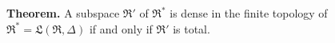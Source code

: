 \textbf{Theorem.} A subspace $\mathfrak{R}'$ of $\mathfrak{R}^*$ is dense in the finite topology of $\mathfrak{R}^* = \mathfrak{L}(\mathfrak{R}, \Delta)$ if and only if $\mathfrak{R}'$ is total.
